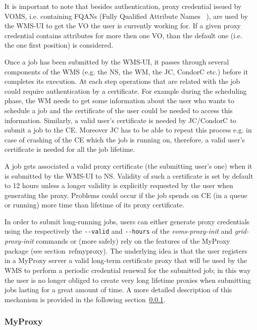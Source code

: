 It is important to note that besides authentication, proxy credential issued by VOMS, i.e. containing 
FQANs (Fully Qualified Attribute Names ~\cite{voms-core}), are used by the WMS-UI to get the VO the user is currently working for. 
If a given proxy credential contains attributes for more then one VO, than the default one (i.e. the one first 
position) is considered.   

Once a job has been submitted by the WMS-UI, it passes through several components of the WMS 
(e.g. the NS, the WM, the JC, CondorC etc.) before it completes its execution. At each step operations 
that are related with the job could require authentication by a certificate. For example during the 
scheduling phase, the WM needs to get some information about the user who wants to schedule a job and 
the certificate of the user could be needed to access this information. Similarly, a valid user's certificate 
is needed by JC/CondorC to submit a job to the CE. Moreover JC has to be able to repeat this process e.g. 
in case of crashing of the CE which the job is running on, therefore, a valid user's certificate is needed 
for all the job lifetime.

A job gets associated a valid proxy certificate (the submitting user's one) when it is submitted by the WMS-UI to 
NS. Validity of such a certificate is set by default to 12 hours unless a longer validity is explicitly 
requested by the user when generating the proxy. Problems could occur if the job spends on CE (in a 
queue or running) more time than lifetime of its proxy certificate.

In order to submit long-running jobs, users can either generate proxy credentials using the respectively 
the \verb!--valid! and \verb!--hours! of the \textit{voms-proxy-init} and \textit{grid-proxy-init} commands 
or (more safely) rely on the features of the MyProxy package (see section~ref{myproxy}). The underlying idea 
is that the user registers in a MyProxy server a valid long-term certificate proxy that will be used by the 
WMS to perform a periodic credential renewal for the submitted job; in this way the user is no longer obliged 
to create very long lifetime proxies when submitting jobs lasting for a great amount of time. 
A more detailed description of this mechanism is provided in the following section~\ref{myproxy}.

\subsubsection {MyProxy} 
\label{myproxy}

